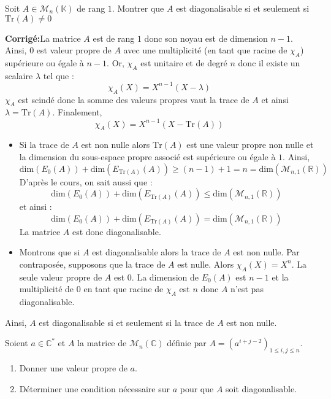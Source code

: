\documentclass[a4paper,twoside,french,10pt]{VcCours}
\newcommand{\corr}{\textbf{Corrigé:}}
\begin{document}
\begin{Exercice}{}\label{Rang} Soit $A \in \mathcal{M}_{n}(\mathbb{K})$ de rang $1$. Montrer que $A$ est diagonalisable si et seulement si $\textrm{Tr}(A) \neq 0$ \end{Exercice}

\corr La matrice $A$ est de rang $1$ donc son noyau est de dimension $n-1$. Ainsi, $0$ est valeur propre de $A$ avec une multiplicité (en tant que racine de $\chi_A$) supérieure ou égale à $n-1$. Or, $\chi_A$ est unitaire et de degré $n$ donc il existe un scalaire $\lambda$ tel que :
$$ \chi_A(X)=X^{n-1}(X- \lambda)$$
$\chi_A$ est scindé donc la somme des valeurs propres vaut la trace de $A$ et ainsi $\lambda = \textrm{Tr}(A)$. Finalement,
$$ \chi_A(X)= X^{n-1}(X- \textrm{Tr}(A))$$
\begin{itemize}
\item Si la trace de $A$ est non nulle alors $\textrm{Tr}(A)$ est une valeur propre non nulle et la dimension du sous-espace propre associé est supérieure ou égale à $1$. Ainsi,
$$ \textrm{dim}(E_0(A))+ \textrm{dim}(E_{\textrm{Tr}(A)}(A)) \geq (n-1)+1 = n = \textrm{dim}(\mathcal{M}_{n,1}(\mathbb{R}))$$
D'après le cours, on sait aussi que :
$$ \textrm{dim}(E_0(A))+ \textrm{dim}(E_{\textrm{Tr}(A)}(A)) \leq \textrm{dim}(\mathcal{M}_{n,1}(\mathbb{R}))$$
et ainsi :
$$ \textrm{dim}(E_0(A))+ \textrm{dim}(E_{\textrm{Tr}(A)}(A)) = \textrm{dim}(\mathcal{M}_{n,1}(\mathbb{R}))$$
La matrice $A$ est donc diagonalisable.
\item Montrons que si $A$ est diagonalisable alors la trace de $A$ est non nulle. Par contraposée, supposons que la trace de $A$ est nulle. Alors $\chi_A(X)=X^n$. La seule valeur propre de $A$ est $0$. La dimension de $E_0(A)$ est $n-1$ et la multiplicité de $0$ en tant que racine de $\chi_A$ est $n$ donc $A$ n'est pas diagonalisable.
\end{itemize}
Ainsi, $A$ est diagonalisable si et seulement si la trace de $A$ est non nulle.

\begin{Exercice}{} Soient $a \in \mathbb{C}^*$ et $A$ la matrice de $\mathcal{M}_n(\mathbb{C})$ définie par $A=( a^{i+j-2})_{1 \leq i,j \leq n}$.

\begin{enumerate}
\item Donner une valeur propre de $a$.
\item Déterminer une condition nécessaire sur $a$ pour que $A$ soit diagonalisable.
\end{enumerate}
\end{Exercice}
\end{document}
